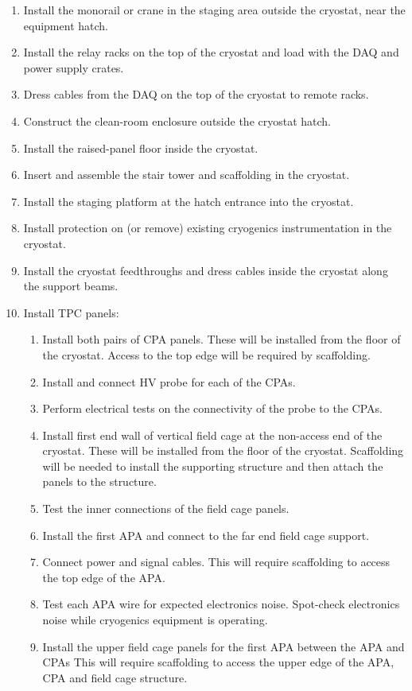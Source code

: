 \begin{enumerate}
\item Install the monorail or crane in the staging area outside the cryostat, near the equipment hatch.
\item Install the relay racks on the top of the cryostat and load with the DAQ and power supply crates.
\item Dress cables from the DAQ on the top of the cryostat to remote racks.
\item Construct the clean-room enclosure outside the cryostat hatch.
\item Install the raised-panel floor inside the cryostat. 
\item Insert and assemble the stair tower and scaffolding in the cryostat.
\item Install the staging platform at the hatch entrance into the cryostat.
\item Install protection on (or remove) existing cryogenics instrumentation in the cryostat.
\item Install the cryostat feedthroughs and dress cables inside the cryostat along the support beams.
\item Install TPC panels:
   \begin{enumerate}
   \item Install both pairs of CPA panels.  These will be installed from the floor of the cryostat.  Access to the top edge will be required by scaffolding.  
   \item Install and connect HV probe for each of the CPAs.
   \item Perform electrical tests on the connectivity of the probe to the CPAs.
   \item Install first end wall of vertical field cage at the non-access end of the cryostat.  These will be installed from the floor of the cryostat.  Scaffolding will be needed to install the supporting structure and then attach the panels to the structure.  
   \item Test the inner connections of the field cage panels.
   \item Install the first APA and connect to the far end field cage support.
   \item Connect power and signal cables.  This will require scaffolding to access the top edge of the APA.
   \item Test each APA wire for expected electronics noise. Spot-check electronics noise while cryogenics equipment is operating.
   \item Install the upper field cage panels for the first APA between the APA and CPAs  This will require scaffolding to access the upper edge of the APA, CPA and field cage structure.

\end{enumerate}
\end{enumerate}
